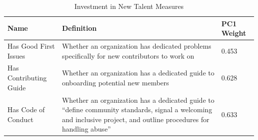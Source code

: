 \begin{longtable}{>{\raggedright\arraybackslash}p{} p{}p{}}
\caption{Investment in New Talent Measures}\label{tab:investment_in_new_talent_metrics}\\
\toprule
\textbf{Name} & \textbf{Definition}  & \textbf{PC1 Weight} \\
\midrule
\endfirsthead




\bottomrule
\endlastfoot
Has Good First Issues & Whether an organization has dedicated problems specifically for new contributors to work on & 0.453\\
Has Contributing Guide & Whether an organization has a dedicated guide to onboarding potential new members & 0.628 \\
Has Code of Conduct & Whether an organization has a dedicated guide to ``define community standards, signal a welcoming and inclusive project, and outline procedures for handling abuse'' \citep{github_adding_2025} & 0.633 \\
\end{longtable}

